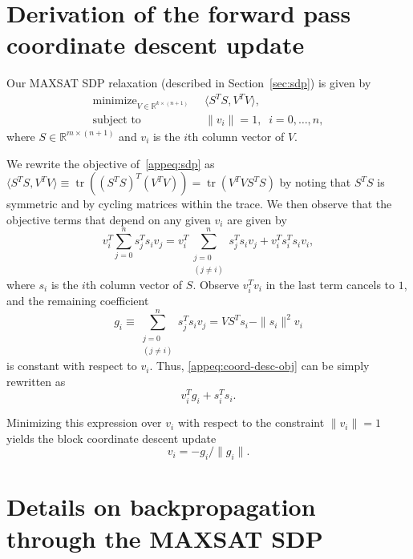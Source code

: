 \documentclass{article}
\DeclareMathOperator*{\minimize}{minimize}
\DeclareMathOperator{\tr}{tr}
\def\subjectto{\mbox{subject to}}
\newcommand{\norm}[1] {\|#1\|}
\newcommand{\mdot}[2]{\langle#1,#2\rangle}
\begin{document}
	\section{Derivation of the forward pass coordinate descent update}
	\label{appsec:coord-desc-fwd}
	
	Our MAXSAT SDP relaxation (described in Section~\ref{sec:sdp}) is given by
	\begin{equation}
		\label{appeq:sdp}
		\begin{aligned}
			\minimize_{V \in \mathbb{R}^{k \times (n+1)}} \;\;&\mdot{S^T S}{V^T V},\\
			\subjectto\;\; &\norm{v_i}=1,\;\;i=0,\ldots,n,
		\end{aligned}
	\end{equation}
	where $S \in \mathbb{R}^{m \times (n+1)}$ and $v_i$ is the $i$th column vector of $V$.
	
	We rewrite the objective of~\eqref{appeq:sdp} as $\mdot{S^T S}{V^T V} \equiv \tr((S^T S)^T (V^T V)) = \tr(V^T V S^T S)$ by noting that $S^T S$ is symmetric and by cycling matrices within the trace. We then observe that the objective terms that depend on any given $v_i$ are given by 
	\begin{equation}
		\label{appeq:coord-desc-obj}
		v_i^T \sum_{j=0}^n s_j^T s_i v_j = v_i^T \sum_{\substack{j=0\\(j \neq i)}}^n s_j^T s_i v_j + v_i^T s_i^T s_i v_i,
	\end{equation}
	where $s_i$ is the $i$th column vector of $S$. Observe $v_i^Tv_i$ in the last term cancels to $1$, and the remaining coefficient
	\begin{equation}
		g_i \equiv \sum_{\substack{j=0\\(j \neq i)}}^n s_j^T s_i v_j = V S^T s_i - \norm{s_i}^2 v_i
	\end{equation} 
	is  constant with respect to $v_i$.
	Thus, \eqref{appeq:coord-desc-obj} can be simply rewritten as 
	\begin{equation}
		v_i^T g_i + s_i^Ts_i.
	\end{equation}
	
	Minimizing this expression over $v_i$ with respect to the constraint  $\|v_i\| = 1$ yields the block coordinate descent update
	\begin{equation}
		\label{appeq:coord-desc}
		v_i = -g_i/\norm{g_i}.
	\end{equation}
	
	\section{Details on backpropagation through the MAXSAT SDP}
	\label{appsec:sdp-backprop}
	
\end{document}

